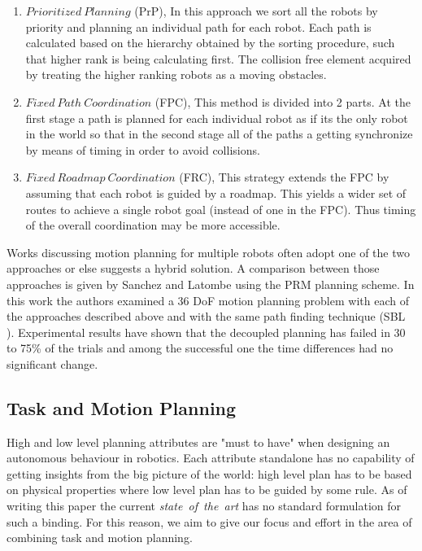 \begin{enumerate}
  \item $Prioritized~Planning$ (PrP), 
In this approach we sort all the robots by priority and planning an individual path for each robot. Each path is calculated based on the hierarchy obtained by the sorting procedure, such that higher rank is being calculating first. The collision free element acquired by treating the higher ranking robots as a moving obstacles.

  \item $Fixed~Path~Coordination$ (FPC),
This method is divided into 2 parts. At the first stage a path is planned for each individual robot as if its the only robot in the world so that in the second stage all of the paths a getting synchronize by means of timing in order to avoid collisions.

  \item $Fixed~Roadmap~Coordination$ (FRC), 
This strategy extends the FPC by assuming that each robot is guided by a roadmap. This yields a wider set of routes to achieve a single robot goal (instead of one in the FPC). Thus timing of the overall coordination may be more accessible.

\end{enumerate}

Works discussing motion planning for multiple robots often adopt one of the two approaches or else suggests a hybrid solution. A comparison between those approaches is given by Sanchez and Latombe \cite{comparecentralizeddecoupled} using the PRM planning scheme. In this work the authors examined a 36 DoF motion planning problem with each of the approaches described above and with the same path finding technique (SBL \cite{sanchez2002delaying}). Experimental results have shown that the decoupled planning has failed in 30 to 75\% of the trials and among the successful one the time differences had no significant change.


\subsection{Task and Motion Planning}
High and low level planning attributes are "must to have" when designing  an autonomous behaviour in robotics. Each attribute standalone has no capability of getting insights from the big picture of the world: high level plan has to be based on physical properties where low level plan has to be guided by some rule. As of writing this paper the current \textit{state~of~the~art} has no standard formulation for such a binding. For this reason, we aim to give our focus and effort in the area of combining task and motion planning.


